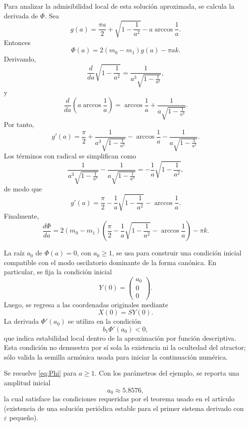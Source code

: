 \documentclass[journal]{IEEEtran}
\begin{document}
Para analizar la admisibilidad local de esta solución aproximada, se calcula
la derivada de \(\Phi\). Sea
\[
g(a)=
\frac{\pi a}{2}
+
\sqrt{1-\frac{1}{a^2}}
-
a\arccos\frac{1}{a}.
\]
Entonces
\[
\Phi(a)=2(m_0-m_1)g(a)-\pi ak.
\]
Derivando,
\[
\frac{d}{da}
\sqrt{1-\frac{1}{a^2}}
=
\frac{1}{a^3\sqrt{1-\frac{1}{a^2}}},
\]
y
\[
\frac{d}{da}
\left(
a\arccos\frac{1}{a}
\right)
=
\arccos\frac{1}{a}
+
\frac{1}{a\sqrt{1-\frac{1}{a^2}}}.
\]
Por tanto,
\[
g'(a)
=
\frac{\pi}{2}
+
\frac{1}{a^3\sqrt{1-\frac{1}{a^2}}}
-
\arccos\frac{1}{a}
-
\frac{1}{a\sqrt{1-\frac{1}{a^2}}}.
\]
Los términos con radical se simplifican como
\[
\frac{1}{a^3\sqrt{1-\frac{1}{a^2}}}
-
\frac{1}{a\sqrt{1-\frac{1}{a^2}}}
=
-\frac{1}{a}\sqrt{1-\frac{1}{a^2}},
\]
de modo que
\[
g'(a)
=
\frac{\pi}{2}
-
\frac{1}{a}\sqrt{1-\frac{1}{a^2}}
-
\arccos\frac{1}{a}.
\]
Finalmente,
\[
\frac{d\Phi}{da}
=
2(m_0-m_1)
\left(
\frac{\pi}{2}
-
\frac{1}{a}\sqrt{1-\frac{1}{a^2}}
-
\arccos\frac{1}{a}
\right)
-\pi k.
\]

La raíz \(a_0\) de \(\Phi(a)=0\), con \(a_0\ge 1\), se usa para construir una
condición inicial compatible con el modo oscilatorio dominante de la forma
canónica. En particular, se fija la condición inicial
\begin{equation}\label{eq:Y0}
Y(0)=
\begin{pmatrix}
a_0\\
0\\
0
\end{pmatrix}.
\end{equation}
Luego, se regresa a las coordenadas originales mediante
\begin{equation}\label{eq:X0_from_Y}
X(0)=SY(0).
\end{equation}
La derivada \(\Phi'(a_0)\) se utiliza en la condición
\[
b_1\Phi'(a_0)<0,
\]
que indica estabilidad local dentro de la aproximación por función descriptiva. Esta condición no demuestra por sí sola la existencia ni la ocultedad del atractor; sólo valida la semilla armónica usada para iniciar la continuación numérica.

\noindent Se resuelve \eqref{eq:Phi} para $a\ge 1$. Con los parámetros del ejemplo, se reporta una amplitud inicial
\[
a_0\approx 5.8576,
\]
la cual satisface las condiciones requeridas por el teorema usado en el artículo (existencia de una solución periódica estable para el primer sistema derivado con $\varepsilon$ pequeño).
\end{document}
